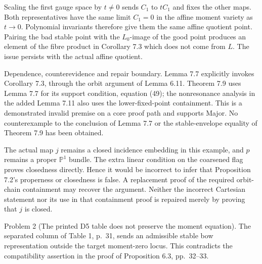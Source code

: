 \documentclass[10pt]{article}
\begin{document}
Scaling the first gauge space by \(t\ne0\) sends \(C_1\) to \(tC_1\) and fixes the other maps. Both representatives have the same limit \(C_1=0\) in the affine moment variety as \(t\to0\). Polynomial invariants therefore give them the same affine quotient point. Pairing the bad stable point with the \(L_0\)-image of the good point produces an element of the fibre product in Corollary 7.3 which does not come from \(L\). The issue persists with the actual affine quotient.\par
Dependence, counterevidence and repair boundary. Lemma 7.7 explicitly invokes Corollary 7.3, through the orbit argument of Lemma 6.11. Theorem 7.9 uses Lemma 7.7 for its support condition, equation (49); the nonresonance analysis in the added Lemma 7.11 also uses the lower-fixed-point containment. This is a demonstrated invalid premise on a core proof path and supports Major. No counterexample to the conclusion of Lemma 7.7 or the stable-envelope equality of Theorem 7.9 has been obtained.\par
The actual map \(j\) remains a closed incidence embedding in this example, and \(p\) remains a proper \(\mathbb P^1\) bundle. The extra linear condition on the coarsened flag proves closedness directly. Hence it would be incorrect to infer that Proposition 7.2’s properness or closedness is false. A replacement proof of the required orbit-chain containment may recover the argument. Neither the incorrect Cartesian statement nor its use in that containment proof is repaired merely by proving that \(j\) is closed.\par
Problem 2 (The printed D5 table does not preserve the moment equation).  The separated column of Table 1, p. 31, sends an admissible stable bow representation outside the target moment-zero locus. This contradicts the compatibility assertion in the proof of Proposition 6.3, pp. 32–33.\par
\end{document}
